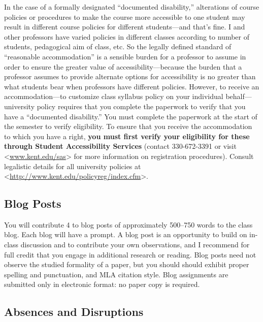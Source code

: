 \documentclass[]{article}
\begin{document}
In the case of a formally designated ``documented disability,''
alterations of course policies or procedures to make the course more
accessible to one student may result in different course policies for
different students---and that's fine. I and other professors have varied
policies in different classes according to number of students,
pedagogical aim of class, etc. So the legally defined standard of
``reasonable accommodation'' is a sensible burden for a professor to
assume in order to ensure the greater value of accessibility---because
the burden that a professor assumes to provide alternate options for
accessibility is no greater than what students bear when professors have
different policies. However, to receive an accommodation---to customize
class syllabus policy on your individual behalf---university policy
requires that you complete the paperwork to verify that you have a
``documented disability.'' You must complete the paperwork at the start
of the semester to verify eligibility. To ensure that you receive the
accommodation to which you have a right, \textbf{you must first verify
your eligibility for these through Student Accessibility Services}
(contact 330-672-3391 or visit
\textless{}\url{www.kent.edu/sas}\textgreater{} for more information on
registration procedures). Consult legalistic details for all university
policies at
\textless{}\url{http://www.kent.edu/policyreg/index.cfm}\textgreater{}.

\subsection{Blog Posts}\label{blog-posts}

You will contribute 4 to blog posts of approximately 500--750 words to
the class blog. Each blog will have a prompt. A blog post is an
opportunity to build on in-class discussion and to contribute your own
observations, and I recommend for full credit that you engage in
additional research or reading. Blog posts need not observe the studied
formality of a paper, but you should should exhibit proper spelling and
punctuation, and MLA citation style. Blog assignments are submitted only
in electronic format: no paper copy is required.

\subsection{Absences and Disruptions}\label{absences-and-disruptions}
\end{document}
